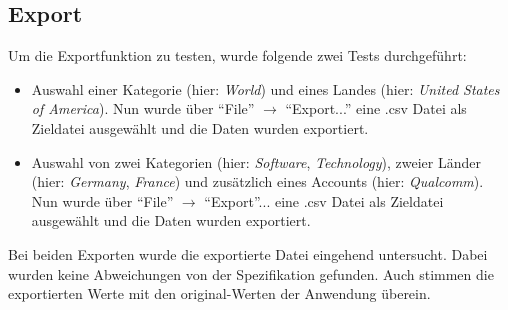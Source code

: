\subsection{Export}
Um die Exportfunktion zu testen, wurde folgende zwei Tests durchgeführt:
\begin{itemize}
\item Auswahl einer Kategorie (hier: \textit{World}) und eines Landes (hier: \textit{United States of America}). Nun wurde über "`File"' $\to$ "`Export..."' eine .csv Datei als Zieldatei ausgewählt und die Daten wurden exportiert.
\item Auswahl von zwei Kategorien (hier: \textit{Software}, \textit{Technology}), zweier Länder (hier: \textit{Germany}, \textit{France}) und zusätzlich eines Accounts (hier: \textit{Qualcomm}). Nun wurde über "`File"' $\to$ "`Export"'... eine .csv Datei als Zieldatei ausgewählt und die Daten wurden exportiert.
\end{itemize}
Bei beiden Exporten wurde die exportierte Datei eingehend untersucht. Dabei wurden keine Abweichungen von der Spezifikation gefunden. Auch stimmen die exportierten Werte mit den original-Werten der Anwendung überein.
